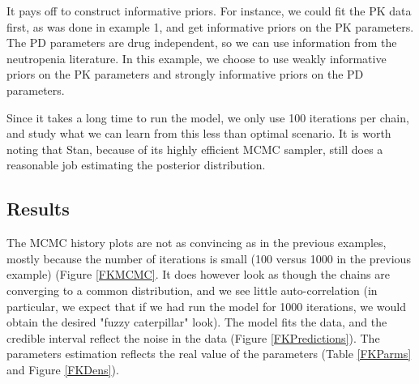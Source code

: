 \documentclass[10pt, reqno, oneside]{amsbook}
\numberwithin{equation}{chapter}
\numberwithin{figure}{chapter}
\numberwithin{table}{chapter}
\theoremstyle{remark}
\begin{document}
It pays off to construct informative priors. For instance, we could
fit the PK data first, as was done in  example 1, and get informative
priors on the PK parameters. The PD parameters are drug independent,
so we can use information from the neutropenia literature. In this
example, we choose to use weakly informative priors on the PK
parameters and strongly informative priors on the PD parameters. 

Since it takes a long time to run the model, we only use 100
iterations per chain, and study what we can learn from this less than
optimal scenario. It is worth noting that Stan, because of its highly
efficient MCMC sampler, still does a reasonable job estimating the
posterior distribution.

\subsection{Results}
\label{sec:orgf39dcb0}
The MCMC history plots are not as convincing
as in the previous examples, mostly because the number of iterations
is small (100 versus 1000 in the previous example) (Figure \ref{FKMCMC}. It does however look as though the chains are converging
to a common distribution, and we see little auto-correlation (in
particular, we expect that if we had run the model for 1000
iterations, we would obtain the desired "fuzzy caterpillar"
look). The model fits the data, and the credible interval reflect the
noise in the data (Figure \ref{FKPredictions}). The parameters
estimation reflects the real value of the parameters (Table \ref{FKParms} and Figure \ref{FKDens}).
\end{document}
